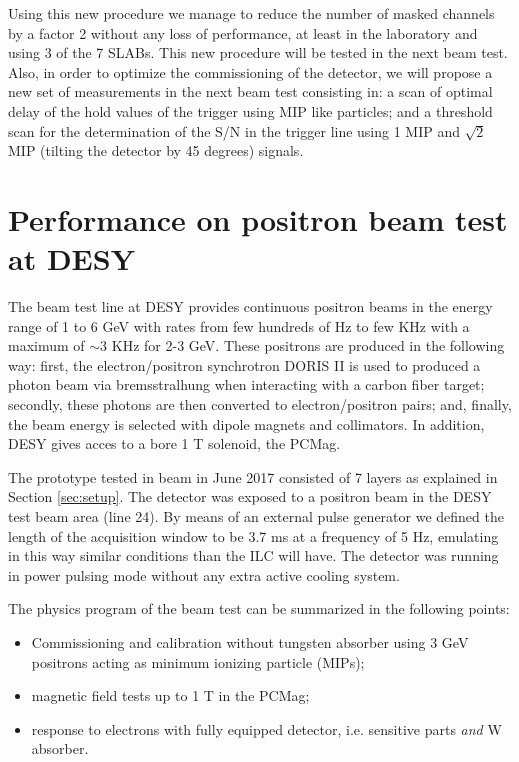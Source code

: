 \documentclass[a4paper,11pt]{article}
\begin{document}
Using this new procedure we manage to reduce the number of masked channels by a factor 2 without any loss of performance,
at least in the laboratory and using 3 of the 7 SLABs. This new procedure will be tested in the next beam test.
Also, in order to
optimize the commissioning of the detector,
we will propose a new set of measurements in the next beam test consisting in:
a scan of optimal delay of the hold values of the trigger using MIP like particles;
and a threshold scan for the determination of the S/N in the trigger line using
1 MIP and $\sqrt{2}$ MIP (tilting the detector by 45 degrees) signals.


\section{Performance on positron beam test at DESY}
\label{sec:beamtest}


The beam test line at DESY provides continuous positron beams in the energy range of 1 to 6 GeV with
rates from few hundreds of Hz to few KHz with a maximum of $\sim 3$ KHz for 2-3 GeV. 
These positrons are produced in the following way: first, the electron/positron synchrotron DORIS II 
is used to produced a photon beam via bremsstralhung when interacting with a carbon fiber target;
secondly, these photons are then converted to electron/positron pairs; 
and, finally, the beam energy is selected with dipole magnets and collimators. 
In addition, DESY gives acces to a bore 1 T solenoid, the PCMag.

The prototype tested in beam in June 2017 consisted of 7 layers as explained in Section \ref{sec:setup}.
The detector was exposed to a positron beam in the DESY test beam area (line 24).
By means of an external pulse generator we defined the length of the acquisition window to be
3.7 ms at a frequency of 5 Hz, emulating in this way similar conditions than the ILC will have.
The detector was running in power pulsing mode without any extra active cooling system.

The physics program of the beam test can be summarized in the following points:

\begin{itemize}
\item Commissioning and calibration without tungsten absorber using 3 GeV positrons acting as minimum ionizing particle (MIPs);
\item magnetic field tests up to 1 T in the PCMag;
\item response to electrons with fully equipped detector, i.e. sensitive parts {\it and} W absorber.
\end{itemize}
\end{document}
